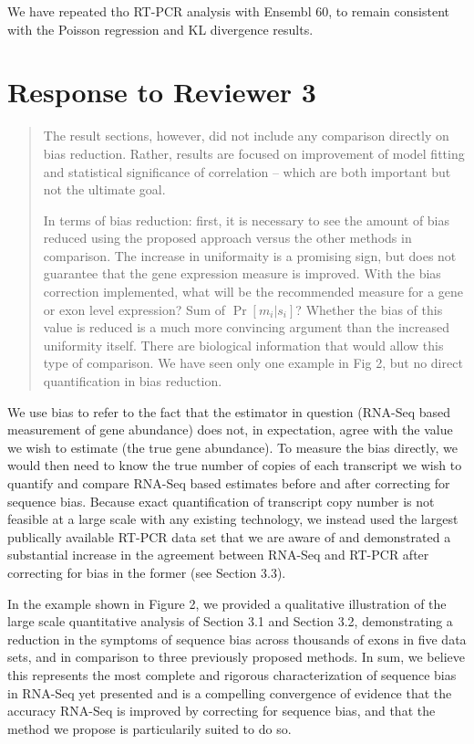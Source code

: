 \documentclass{article}
\begin{document}
We have repeated tho RT-PCR analysis with Ensembl 60, to remain consistent with
the Poisson regression and KL divergence results.


\section*{Response to Reviewer 3}


\begin{quote}
The result sections, however, did not include any comparison directly
on bias reduction. Rather, results are focused on improvement of model
fitting and statistical significance of correlation -- which are both
important but not the ultimate goal.

In terms of bias reduction: first, it is necessary to see the amount of bias
reduced using the proposed approach versus the other methods in
comparison.  The increase in uniformaity is a promising sign, but does
not guarantee that the gene expression measure is improved.  With the
bias correction implemented, what will be the recommended measure for
a gene or exon level expression? Sum of $\Pr[m_i|s_i]$? Whether the bias of
this value is reduced is a much more convincing argument than the
increased uniformity itself. There are  biological information that
would allow this type of comparison. We have seen only one example in
Fig 2, but no direct quantification in bias reduction.
\end{quote}

We use bias to refer to the fact that the estimator in question (RNA-Seq
based measurement of gene abundance) does not, in expectation, agree with the
value we wish to estimate (the true gene abundance). To measure the bias
directly, we would then need to know the true number of copies of each
transcript we wish to quantify and compare RNA-Seq based estimates before and
after correcting for sequence bias. Because exact quantification of transcript
copy number is not feasible at a large scale with any existing technology, we
instead used the largest publically available RT-PCR data set that we are aware
of and demonstrated a substantial increase in the agreement between RNA-Seq and
RT-PCR after correcting for bias in the former (see Section 3.3).

In the example shown in Figure 2, we provided a qualitative illustration of the
large scale quantitative analysis of Section 3.1 and Section 3.2, demonstrating
a reduction in the symptoms of sequence bias across thousands of exons in five
data sets, and in comparison to three previously proposed methods. In sum, we
believe this represents the most complete and rigorous characterization of
sequence bias in RNA-Seq yet presented and is a compelling convergence of
evidence that the accuracy RNA-Seq is improved by correcting for sequence
bias, and that the method we propose is particularily suited to do so.
\end{document}
